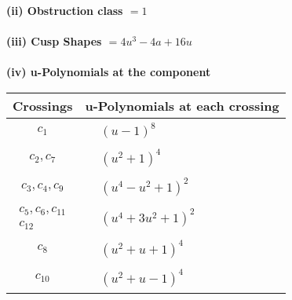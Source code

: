 \documentclass[1p]{elsarticle_modified}
\theoremstyle{definition}
\begin{document}
\flushleft \textbf{(ii) Obstruction class $= 1$}\\~\\
\flushleft \textbf{(iii) Cusp Shapes $= 4 u^3-4 a+16 u$}\\~\\
\newpage\renewcommand{\arraystretch}{1}
\flushleft \textbf{(iv) u-Polynomials at the component}\newline \\
\begin{tabular}{m{50pt}|m{274pt}}
Crossings & \hspace{64pt}u-Polynomials at each crossing \\
\hline $$\begin{aligned}c_{1}\end{aligned}$$&$\begin{aligned}
&(u-1)^8
\end{aligned}$\\
\hline $$\begin{aligned}c_{2},c_{7}\end{aligned}$$&$\begin{aligned}
&(u^2+1)^4
\end{aligned}$\\
\hline $$\begin{aligned}c_{3},c_{4},c_{9}\end{aligned}$$&$\begin{aligned}
&(u^4- u^2+1)^2
\end{aligned}$\\
\hline $$\begin{aligned}c_{5},c_{6},c_{11}\\c_{12}\end{aligned}$$&$\begin{aligned}
&(u^4+3 u^2+1)^2
\end{aligned}$\\
\hline $$\begin{aligned}c_{8}\end{aligned}$$&$\begin{aligned}
&(u^2+u+1)^4
\end{aligned}$\\
\hline $$\begin{aligned}c_{10}\end{aligned}$$&$\begin{aligned}
&(u^2+u-1)^4
\end{aligned}$\\
\hline
\end{tabular}\\~\\
\end{document}
